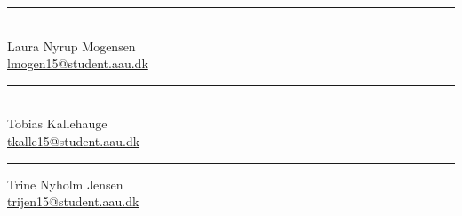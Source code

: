 \vspace{1\baselineskip}
\begin{minipage}[b]{0.45\textwidth}
 \centering
 \rule{\textwidth}{0.5pt}\\
Laura Nyrup Mogensen\\
 {\footnotesize \href{mailto:lmogen15@student.aau.dk}{lmogen15@student.aau.dk}}  
\end{minipage}
\hfill
\begin{minipage}[b]{0.45\textwidth}
 \centering
 \rule{\textwidth}{0.5pt}\\
 Tobias Kallehauge\\
 {\footnotesize \href{mailto:tkalle15@student.aau.dk}{tkalle15@student.aau.dk}}  
\end{minipage}
\vspace{2\baselineskip}
\vspace{1\baselineskip}
\begin{center}
\begin{minipage}[b]{0.45\textwidth}
 \centering
 \rule{\textwidth}{0.5pt}
Trine Nyholm Jensen\\
 {\footnotesize \href{mailto:trijen15@student.aau.dk}{trijen15@student.aau.dk}}  
\end{minipage}
\end{center}